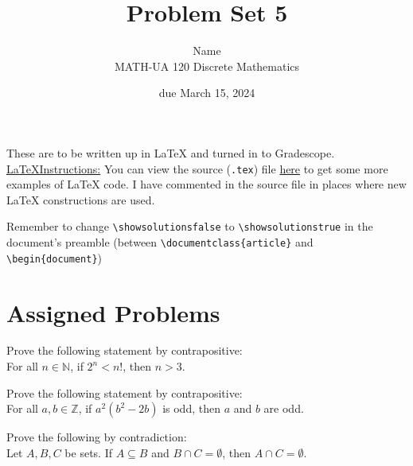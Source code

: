 \documentclass{article}
\title{Problem Set 5}
\author{%
    Name
\\  MATH-UA 120 Discrete Mathematics
}
\date{due March 15, 2024}
\newif\ifshowsolutions
\newcommand{\danger}{\marginpar[\hfill\dbend]{\dbend\hfill}}
\theoremstyle{definition}
\begin{document}
\maketitle



These are to be written up in \LaTeX{} and turned in to Gradescope.\\



\ifshowsolutions
    \SetupExSheets{solution/print=true}
\else
    \danger
 \underline{ \LaTeX  Instructions:}  You can view the source (\texttt{.tex}) file \href{https://bit.ly/43f8Zmb}{here} to get some more examples of \LaTeX{} code.  I have commented in the source file in places where new \LaTeX{} constructions are used.
  
  Remember to change \verb|\showsolutionsfalse| to \verb|\showsolutionstrue|
    in the document's preamble 
    (between \verb|\documentclass{article}| and \verb|\begin{document}|)
\fi

\section*{Assigned Problems}

\begin{question}{5}
    Prove the following statement by contrapositive: \\
    For all $n\in \mathbb{N}$, if $2^n<n!$, then $n>3$.
\end{question}
\begin{solution}
\end{solution}

\begin{question}{5}
    Prove the following statement by contrapositive: \\
    For all $a, b\in \mathbb{Z}$, if $a^2(b^2-2b)$ is odd, then $a$ and $b$ are odd.
\end{question}
\begin{solution}
\end{solution}


\begin{question}{5}
    Prove the following by contradiction:\\
    Let $A, B, C$ be sets. If $A\subseteq B$ and $B\cap C=\emptyset$, then $A\cap C=\emptyset$.
\end{question}
\begin{solution}
\end{solution}
\end{document}
